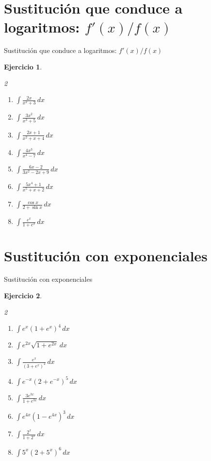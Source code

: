 \documentclass[10pt,aspectratio=169]{beamer}
\newtheorem{Ejer}{Ejercicio}
\begin{document}
\section{Sustitución que conduce a logaritmos: $f'(x)/f(x)$}
\begin{frame}{Sustitución que conduce a logaritmos: $f'(x)/f(x)$}
\begin{Ejer}
\begin{multicols}{2}
\begin{enumerate}
\item $\displaystyle \int\frac{2x}{x^2+3}\,dx$
\item $\displaystyle \int\frac{3x^2}{x^3+5}\,dx$
\item $\displaystyle \int\frac{2x+1}{x^2+x+4}\,dx$
\item $\displaystyle \int\frac{4x^3}{x^4-7}\,dx$
\item $\displaystyle \int\frac{6x-2}{3x^2-2x+9}\,dx$
\item $\displaystyle \int\frac{5x^4+1}{x^5+x+2}\,dx$
\item $\displaystyle \int\frac{\cos x}{2+\sin x}\,dx$
\item $\displaystyle \int\frac{e^x}{1+e^x}\,dx$
\end{enumerate}
\end{multicols}
\end{Ejer}

\end{frame}

\section{Sustitución con exponenciales}
\begin{frame}{Sustitución con exponenciales}
\begin{Ejer}
\begin{multicols}{2}
\begin{enumerate}
\item $\displaystyle \int e^x(1+e^x)^4\,dx$
\item $\displaystyle \int e^{2x}\sqrt{1+e^{2x}}\,dx$
\item $\displaystyle \int\frac{e^x}{(3+e^x)^2}\,dx$
\item $\displaystyle \int e^{-x}(2+e^{-x})^5\,dx$
\item $\displaystyle \int\frac{3e^{3x}}{1+e^{3x}}\,dx$
\item $\displaystyle \int e^{4x}(1-e^{4x})^3\,dx$
\item $\displaystyle \int\frac{2^x}{1+2^x}\,dx$
\item $\displaystyle \int 5^x(2+5^x)^6\,dx$
\end{enumerate}
\end{multicols}
\end{Ejer}

\end{frame}
\end{document}
